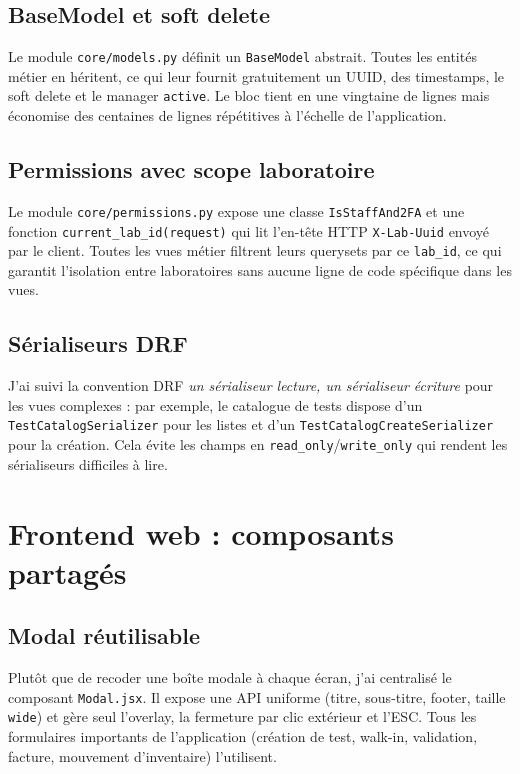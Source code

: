 \documentclass[12pt, a4paper, oneside]{report}
\begin{document}
\subsection{BaseModel et soft delete}
Le module \texttt{core/models.py} définit un \texttt{BaseModel}
abstrait. Toutes les entités métier en héritent, ce qui leur fournit
gratuitement un UUID, des timestamps, le soft delete et le manager
\texttt{active}. Le bloc tient en une vingtaine de lignes mais
économise des centaines de lignes répétitives à l'échelle de
l'application.

\subsection{Permissions avec scope laboratoire}
Le module \texttt{core/permissions.py} expose une classe
\texttt{IsStaffAnd2FA} et une fonction \texttt{current\_lab\_id(request)}
qui lit l'en-tête HTTP \texttt{X-Lab-Uuid} envoyé par le client. Toutes
les vues métier filtrent leurs querysets par ce \texttt{lab\_id}, ce
qui garantit l'isolation entre laboratoires sans aucune ligne de code
spécifique dans les vues.

\subsection{Sérialiseurs DRF}
J'ai suivi la convention DRF \emph{un sérialiseur lecture, un
sérialiseur écriture} pour les vues complexes : par exemple, le
catalogue de tests dispose d'un \texttt{TestCatalogSerializer} pour
les listes et d'un \texttt{TestCatalogCreateSerializer} pour la
création. Cela évite les champs en \texttt{read\_only}/\texttt{write\_only}
qui rendent les sérialiseurs difficiles à lire.

\section{Frontend web : composants partagés}

\subsection{Modal réutilisable}
Plutôt que de recoder une boîte modale à chaque écran, j'ai centralisé
le composant \texttt{Modal.jsx}. Il expose une API uniforme (titre,
sous-titre, footer, taille \texttt{wide}) et gère seul l'overlay, la
fermeture par clic extérieur et l'ESC. Tous les formulaires importants
de l'application (création de test, walk-in, validation, facture,
mouvement d'inventaire) l'utilisent.
\end{document}

